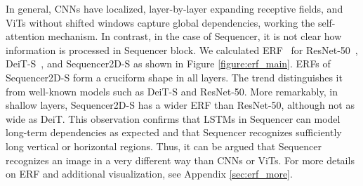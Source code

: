 \documentclass{article}
\begin{document}
In general, CNNs have localized, layer-by-layer expanding receptive fields, and ViTs without shifted windows capture global dependencies, working the self-attention mechanism. In contrast, in the case of Sequencer, it is not clear how information is processed in Sequencer block. We calculated ERF~\cite{luo2016understanding} for ResNet-50~\cite{he2016deep}, DeiT-S~\cite{touvron2020training}, and Sequencer2D-S as shown in Figure \ref{figure:erf_main}. ERFs of Sequencer2D-S form a cruciform shape in all layers. The trend distinguishes it from well-known models such as DeiT-S and ResNet-50. More remarkably, in shallow layers, Sequencer2D-S has a wider ERF than ResNet-50, although not as wide as DeiT. This observation confirms that LSTMs in Sequencer can model long-term dependencies as expected and that Sequencer recognizes sufficiently long vertical or horizontal regions. Thus, it can be argued that Sequencer recognizes an image in a very different way than CNNs or ViTs. For more details on ERF and additional visualization, see Appendix \ref{sec:erf_more}.
\end{document}

